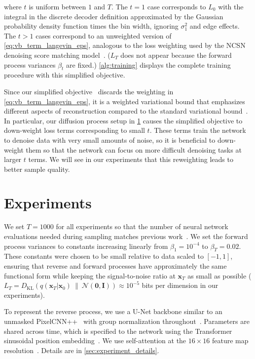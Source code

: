 where $t$ is uniform between $1$ and $T$. The $t=1$ case corresponds to $L_0$ with the integral in the discrete decoder definition  approximated by the Gaussian probability density function times the bin width, ignoring $\sigma_1^2$ and edge effects. The $t > 1$ cases correspond to an unweighted version of \ref{eq:vb_term_langevin_eps}, analogous to the loss weighting used by the NCSN denoising score matching model~\citep{song2019generative}. ($L_T$ does not appear because the forward process variances $\beta_t$ are fixed.)
\ref{alg:training} displays the complete training procedure with this simplified objective.

Since our simplified objective~ discards the weighting in \ref{eq:vb_term_langevin_eps}, it is a weighted variational bound that emphasizes different aspects of reconstruction compared to the standard variational bound~\citep{gregor2016towards,higgins2017beta}. In particular, our diffusion process setup in \ref{sec:experiments} causes the simplified objective to down-weight loss terms corresponding to small $t$. These terms train the network to denoise data with very small amounts of noise, so it is beneficial to down-weight them so that the network can focus on more difficult denoising tasks at larger $t$ terms. We will see in our experiments that this reweighting leads to better sample quality.

\section{Experiments}
\label{sec:experiments}

We set $T=1000$ for all experiments so that the number of neural network evaluations needed during sampling matches previous work~\citep{sohl2015deep,song2019generative}. We set the forward process variances to constants increasing linearly from $\beta_1 = 10^{-4}$ to $\beta_T = 0.02$. These constants were chosen to be small relative to data scaled to $[-1, 1]$, ensuring that reverse and forward processes have approximately the same functional form while keeping the signal-to-noise ratio at $\mathbf{x}_T$ as small as possible ($L_T = D_{\mathrm{KL}}\!\left(q(\mathbf{x}_T|\mathbf{x}_0) ~ \| ~ \mathcal{N}(\mathbf{0}, \mathbf{I})\right) \approx 10^{-5}$ bits per dimension in our experiments).

To represent the reverse process, we use a U-Net backbone similar to an unmasked \mbox{PixelCNN++}~\citep{salimans2017pixelcnn++,ronneberger2015unet} with group normalization throughout~\citep{wu2018group}. Parameters are shared across time, which is specified to the network using the Transformer sinusoidal position embedding~\citep{vaswani2017attention}. We use self-attention at the $16 \times 16$ feature map resolution~\citep{wang2018non,vaswani2017attention}. Details are in \ref{sec:experiment_details}.

